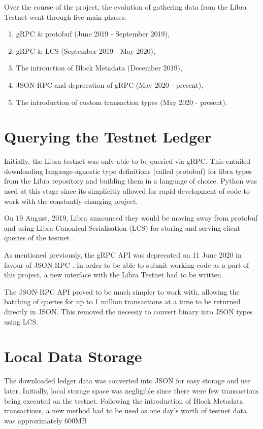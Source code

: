 \documentclass[12pt,openany,a4paper]{book}
\begin{document}
Over the course of the project, the evolution of gathering data from the Libra
Testnet went through five main phases:

\begin{enumerate}
    \item gRPC \& protobuf (June 2019 - September 2019),
    \item gRPC \& LCS (September 2019 - May 2020),
    \item The introuction of Block Metadata (December 2019),
    \item JSON-RPC and deprecation of gRPC (May 2020 - present),
    \item The introduction of custom transaction types (May 2020 - present).
\end{enumerate}

\section{Querying the Testnet Ledger}
\label{query_testnet_ledger}
Initially, the Libra testnet was only able to be queried via gRPC. This entailed downloading 
langauge-agnostic type definitions (called protobuf) for libra types from the Libra repository and 
building them in a language of choice. Python was used at this stage since its simplicitly
allowed for rapid development of code to work with the constantly changing project.

On 19 August, 2019, Libra announced they would be moving away from protobuf and using 
Libra Canonical Serialisation (LCS) for storing and serving client queries of the 
testnet \cite{libra_lcs}.

As mentioned previously, the gRPC API was deprecated on 11 June 2020 in favour of 
JSON-RPC \cite{libra_jsonrpc}. In order to be able to submit working code as a part 
of this project, a new interface with the Libra Testnet had to be written.

The JSON-RPC API proved to be much simpler to work with, allowing the batching of queries 
for up to 1 million transactions at a time to be returned directly in JSON. This 
removed the necessiy to convert binary into JSON types using LCS.

\section{Local Data Storage}
\label{local_data_storage}
The downloaded ledger data was converted into JSON for easy storage and use later.
Initially, local storage space was negligible since there were few transactions 
being executed on the testnet. Following the introduction of Block Metadata transactions, a new 
method had to be used as one day's worth of testnet data was approximately 600MB
\end{document}
